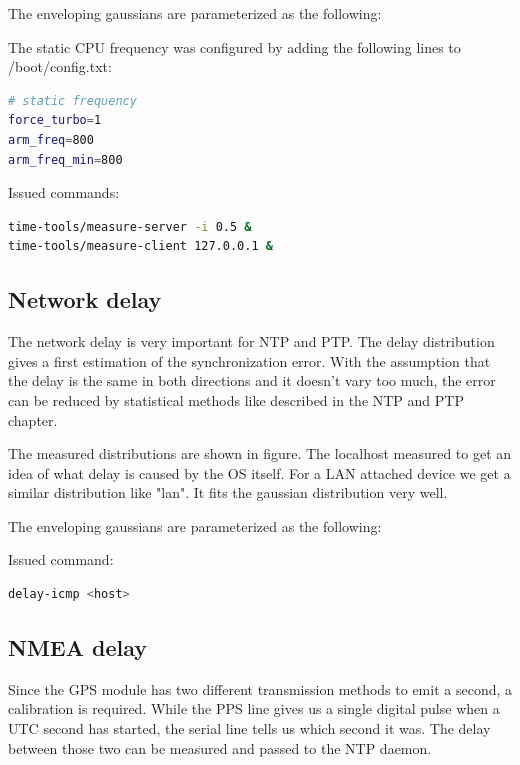 The enveloping gaussians are parameterized as the following:


The static CPU frequency was configured by adding the following lines to /boot/config.txt:
\begin{lstlisting}[language=bash]
# static frequency
force_turbo=1
arm_freq=800
arm_freq_min=800
\end{lstlisting}

Issued commands:

\begin{lstlisting}[language=bash]
time-tools/measure-server -i 0.5 &
time-tools/measure-client 127.0.0.1 &
\end{lstlisting}

\subsection{Network delay}

The network delay is very important for NTP and PTP. The delay distribution gives a first estimation of the synchronization error. With the assumption that the delay is the same in both directions and it doesn’t vary too much, the error can be reduced by statistical methods like described in the NTP and PTP chapter.


The measured distributions are shown in figure. The localhost measured to get an idea of what delay is caused by the OS itself. For a LAN attached device we get a similar distribution like "lan". It fits the gaussian distribution very well.

The enveloping gaussians are parameterized as the following:


Issued command:

\begin{lstlisting}[language=bash]
delay-icmp <host>
\end{lstlisting}

\subsection{NMEA delay}

Since the GPS module has two different transmission methods to emit a second, a calibration is required. While the PPS line gives us a single digital pulse when a UTC second has started, the serial line tells us which second it was. The delay between those two can be measured and passed to the NTP daemon.

